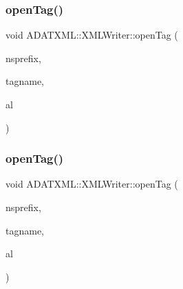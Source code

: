 \mbox{\label{classADATXML_1_1XMLWriter_a26795936be9ebee12c374fa82065ffb5}} 
\subsubsection{\texorpdfstring{openTag()}{openTag()}\hspace{0.1cm}{\footnotesize\ttfamily [11/12]}}
{\footnotesize\ttfamily void A\+D\+A\+T\+X\+M\+L\+::\+X\+M\+L\+Writer\+::open\+Tag (\begin{DoxyParamCaption}\item[{const std\+::string \&}]{nsprefix,  }\item[{const std\+::string \&}]{tagname,  }\item[{\mbox{\hyperlink{namespaceXMLWriterAPI_a28cf3d8051a4ccf0aef208b7ebc66d07}{X\+M\+L\+Writer\+A\+P\+I\+::\+Attribute\+List}} \&}]{al }\end{DoxyParamCaption})}

\mbox{\label{classADATXML_1_1XMLWriter_a26795936be9ebee12c374fa82065ffb5}} 
\subsubsection{\texorpdfstring{openTag()}{openTag()}\hspace{0.1cm}{\footnotesize\ttfamily [12/12]}}
{\footnotesize\ttfamily void A\+D\+A\+T\+X\+M\+L\+::\+X\+M\+L\+Writer\+::open\+Tag (\begin{DoxyParamCaption}\item[{const std\+::string \&}]{nsprefix,  }\item[{const std\+::string \&}]{tagname,  }\item[{\mbox{\hyperlink{namespaceXMLWriterAPI_a28cf3d8051a4ccf0aef208b7ebc66d07}{X\+M\+L\+Writer\+A\+P\+I\+::\+Attribute\+List}} \&}]{al }\end{DoxyParamCaption})}

\mbox{\label{classADATXML_1_1XMLWriter_a82f1a99241ecd26ea2bd7f3d87364ed7}} 
